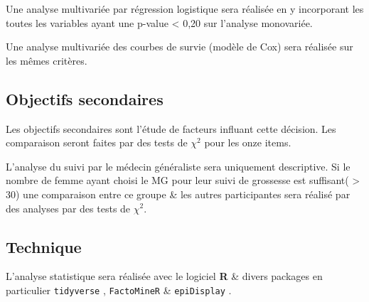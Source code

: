 \documentclass[
  a4paperpaper,
  french]{scrartcl}
\begin{document}
Une analyse multivariée par régression logistique sera réalisée en y
incorporant les toutes les variables ayant une p-value \textless{} 0,20
sur l'analyse monovariée.

Une analyse multivariée des courbes de survie (modèle de Cox) sera
réalisée sur les mêmes critères.

\hypertarget{objectifs-secondaires}{%
\subsection{Objectifs secondaires}\label{objectifs-secondaires}}

Les objectifs secondaires sont l'étude de facteurs influant cette
décision. Les comparaison seront faites par des tests de \(\chi^2\) pour
les onze items.

L'analyse du suivi par le médecin généraliste sera uniquement
descriptive. Si le nombre de femme ayant choisi le MG pour leur suivi de
grossesse est suffisant( \textgreater{} 30) une comparaison entre ce
groupe \& les autres participantes sera réalisé par des analyses par des
tests de \(\chi^2\).

\hypertarget{technique}{%
\subsection{Technique}\label{technique}}

L'analyse statistique sera réalisée avec le logiciel
\textbf{R}\autocite{rstat} \& divers packages en particulier
\texttt{tidyverse} \autocite{tidy}, \texttt{FactoMineR} \autocite{facto}
\& \texttt{epiDisplay} \autocite{epid}.


\printbibliography
\end{document}
